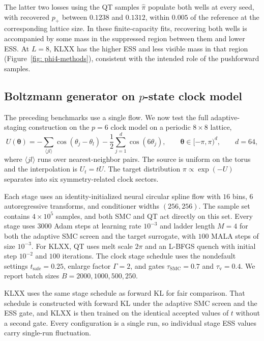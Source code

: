 \documentclass{article}
\begin{document}
The latter two losses using the QT samples $\hat\pi$ populate both wells at every seed, with recovered $p_+$ between $0.1238$ and $0.1312$, within $0.005$ of {\color{blue}the reference} at the corresponding lattice size. In these finite-capacity fits, recovering both wells is accompanied by some mass in the suppressed region between them and lower ESS. At $L=8$, KLXX has the higher ESS and less visible mass in that region {\color{blue}(Figure~\ref{fig: phi4-methods})}, consistent with the intended role of the pushforward samples.

\subsection{Boltzmann generator on \texorpdfstring{$p$}{p}-state clock model}
\label{subsec: clock}

The preceding benchmarks use a single flow. We now test the full adaptive-staging construction on the $p=6$ clock model on a periodic $8\times8$ lattice,
\begin{equation}
U(\boldsymbol\theta)
=-\sum_{\langle jl\rangle}\cos(\theta_j-\theta_l)
-\frac12\sum_{j=1}^{d}\cos(6\theta_j),
\qquad \boldsymbol\theta\in[-\pi,\pi)^{d},\qquad d=64,
\label{eq: clock-potential}
\end{equation}
where $\langle jl\rangle$ runs over nearest-neighbor pairs. The source is uniform on the torus and the interpolation is $U_t=tU$. The target distribution $\pi\propto\exp(-U)$ separates into six symmetry-related clock sectors.

Each stage uses an identity-initialized neural circular spline flow with $16$ bins, $6$ autoregressive transforms, and conditioner widths $(256,256)$. The sample set contains $4\times10^5$ samples, and both SMC and QT act directly on this set. Every stage uses $3000$ Adam steps at learning rate $10^{-3}$ and ladder length $M=4$ for both the adaptive SMC screen and the target surrogate, with $100$ MALA steps of size $10^{-3}$. For KLXX, QT uses melt scale $2\pi$ and an L-BFGS quench with initial step $10^{-2}$ and $100$ iterations. The clock stage schedule uses the nondefault settings $t_{\mathrm{safe}}=0.25$, enlarge factor $\Gamma=2$, and gates $\tau_{\mathrm{SMC}}=0.7$ and $\tau_{\mathrm v}=0.4$. We report batch sizes $B=2000,1000,500,250$.

KLXX uses the same stage schedule as forward KL for fair comparison. That schedule is constructed with forward KL under the adaptive SMC screen and the ESS gate, and KLXX is then trained on the identical accepted values of $t$ without a second gate. Every configuration is a single run, so individual stage ESS values carry single-run fluctuation.
\end{document}
